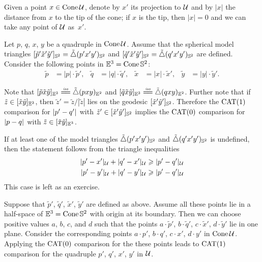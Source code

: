 Given a point $x\in \mathop{\rm Cone}\nolimits\mathcal{U}$, denote by $x'$ its projection to $\mathcal{U}$
and by $|x|$ the distance from $x$ to the tip of the cone;
if $x$ is the tip, then $|x|=0$ and we can take any point of $\mathcal{U}$ as~$x'$.

Let $p$, $q$, $x$, $y$
be a quadruple in $\mathop{\rm Cone}\nolimits\mathcal{U}$.
Assume that the spherical model triangles $[\tilde p'\tilde x'\tilde y']_{\mathbb{S}^2}=\tilde\triangle(p'x'y')_{\mathbb{S}^2}$ and $[\tilde q'\tilde x'\tilde y']_{\mathbb{S}^2}=\tilde\triangle(q'x'y')_{\mathbb{S}^2}$ are defined.
Consider the following points in $\mathbb{E}^3=\mathop{\rm Cone}\nolimits\mathbb{S}^2$: 
\begin{align*}
\tilde p&=|p|\cdot\tilde p',
&
\tilde q&=|q|\cdot\tilde q',
&
\tilde x&=|x|\cdot\tilde x',
&
\tilde y&=|y|\cdot\tilde y'.
\end{align*}

Note that
$\trig{\tilde p}{\tilde x}{\tilde y}_{\EE^3}\iso\modtrig(pxy)_{\EE^2}$
and
$\trig{\tilde q}{\tilde x}{\tilde y}_{\EE^3}\iso\modtrig(qxy)_{\EE^2}$.
Further note that if $\tilde z\in [\tilde x\tilde y]_{\mathbb{E}^3}$, then
$\tilde z'=\tilde z/|\tilde z|$ lies on the geodesic $[\tilde x'\tilde y']_{\mathbb{S}^2}$.
Therefore the $\mathrm{CAT}(1)$ comparison for $\dist{p'}{q'}{}$ with $\tilde z'\in[\tilde x'\tilde y']_{\mathbb{S}^2}$ implies the 
$\mathrm{CAT}(0)$ comparison for $\dist{p}{q}{}$ with $\tilde z\in[\tilde x\tilde y]_{\mathbb{E}^3}$.

If at least one of the model triangles $\tilde\triangle(p'x'y')_{\mathbb{S}^2}$ and $\tilde\triangle(q'x'y')_{\mathbb{S}^2}$ is undefined,
then the statement follows from the triangle inequalities 
\begin{align*}
|p'-x'|_{\mathcal{U}}+|q'-x'|_{\mathcal{U}}
&\geqslant |p'-q'|_{\mathcal{U}}
\\
|p'-y'|_{\mathcal{U}}+|q'-y'|_{\mathcal{U}}
&\geqslant |p'-q'|_{\mathcal{U}}
\end{align*}
This case is left as an exercise. %

Suppose that $\tilde p'$, $\tilde q'$, $\tilde x'$, $\tilde y'$ are defined as above.
Assume all these points lie in a half-space of $\mathbb{E}^3=\mathop{\rm Cone}\nolimits\mathbb{S}^2$ with origin at its boundary. 
Then we can choose positive values $a$, $b$, $c$, and $d$ such that the points $a\cdot \tilde p'$, $b\cdot \tilde q'$, $c\cdot \tilde x'$, $d\cdot \tilde y'$ lie in one plane.
Consider the corresponding points $a\cdot  p'$, $b\cdot  q'$, $c\cdot  x'$, $d\cdot y'$ in $\mathop{\rm Cone}\nolimits\mathcal{U}$.
Applying the $\mathrm{CAT}(0)$ comparison for the these points leads to $\mathrm{CAT}(1)$ comparison for the quadruple $ p'$, $q'$, $ x'$, $ y'$ in $\mathcal{U}$.

